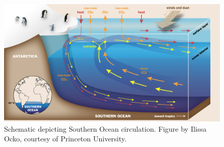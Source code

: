 \begin{figure}
\centering
\includegraphics[width=33pc]{Southern_Ocean.jpg}
\caption{Schematic depicting Southern Ocean circulation. Figure by Ilissa Ocko, courtesy of Princeton University.}
\label{fig:carbon_cycle}
\end{figure}


